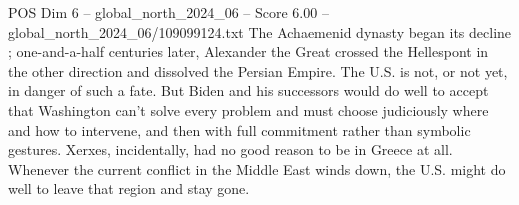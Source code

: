 \begin{textsample}{POS Dim 6 – global\_north\_2024\_06 – Score 6.00 – global\_north\_2024\_06/109099124.txt}
The Achaemenid dynasty began its decline ; one-and-a-half centuries later, Alexander the Great crossed the Hellespont in the other direction and dissolved the Persian Empire.
The U.S. is not, or not yet, in danger of such a fate.
But Biden and his successors would do well to accept that Washington can't solve every problem and must choose judiciously where and how to intervene, and then with full commitment rather than symbolic gestures.
Xerxes, incidentally, had no good reason to be in Greece at all.
Whenever the current conflict in the Middle East winds down, the U.S. might do well to leave that region and stay gone.

\end{textsample}
